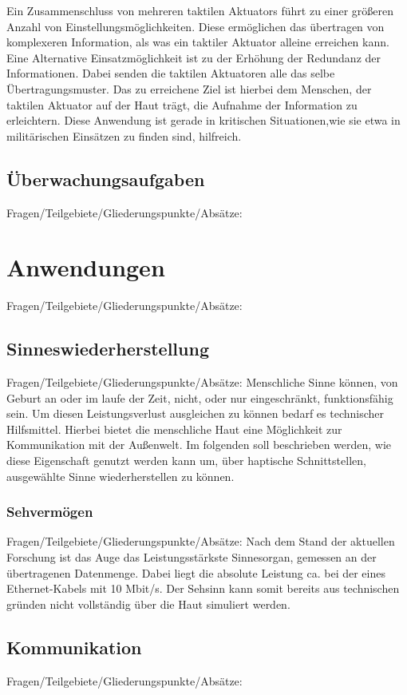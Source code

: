 \documentclass{llncs}					%
\begin{document}
Ein Zusammenschluss von mehreren taktilen \glspl{Aktuator} führt zu einer größeren Anzahl von Einstellungsmöglichkeiten. Diese ermöglichen das übertragen von komplexeren Information, als was ein taktiler Aktuator alleine erreichen kann. Eine Alternative Einsatzmöglichkeit ist zu der Erhöhung der Redundanz der Informationen. Dabei senden die taktilen Aktuatoren alle das selbe Übertragungsmuster. Das zu erreichene Ziel ist hierbei dem Menschen, der taktilen Aktuator auf der Haut trägt, die Aufnahme der Information zu erleichtern. Diese Anwendung ist gerade in kritischen Situationen,wie sie etwa in militärischen Einsätzen zu finden sind, hilfreich\cite{nikolic1998multisensory}.
\subsection{Überwachungsaufgaben}
Fragen/Teilgebiete/Gliederungspunkte/Absätze:

\section{Anwendungen}
Fragen/Teilgebiete/Gliederungspunkte/Absätze:

\subsection{Sinneswiederherstellung}
Fragen/Teilgebiete/Gliederungspunkte/Absätze:
Menschliche Sinne können, von Geburt an oder im laufe der Zeit, nicht, oder nur eingeschränkt, funktionsfähig sein. Um diesen Leistungsverlust ausgleichen zu können bedarf es technischer Hilfsmittel. Hierbei bietet die menschliche Haut eine Möglichkeit zur Kommunikation mit der Außenwelt. Im folgenden soll beschrieben werden, wie diese Eigenschaft genutzt werden kann um, über haptische Schnittstellen, ausgewählte Sinne wiederherstellen zu können.

\subsubsection{Sehvermögen}
Fragen/Teilgebiete/Gliederungspunkte/Absätze:
Nach dem Stand der aktuellen Forschung ist das Auge das Leistungsstärkste Sinnesorgan, gemessen an der übertragenen Datenmenge\cite{Koch2006}. Dabei liegt die absolute Leistung ca. bei der eines Ethernet-Kabels mit 10 Mbit/s\cite{Koch2006}. Der Sehsinn kann somit bereits aus technischen gründen nicht vollständig über die Haut simuliert werden.
\subsection{Kommunikation}
Fragen/Teilgebiete/Gliederungspunkte/Absätze:
\end{document}
